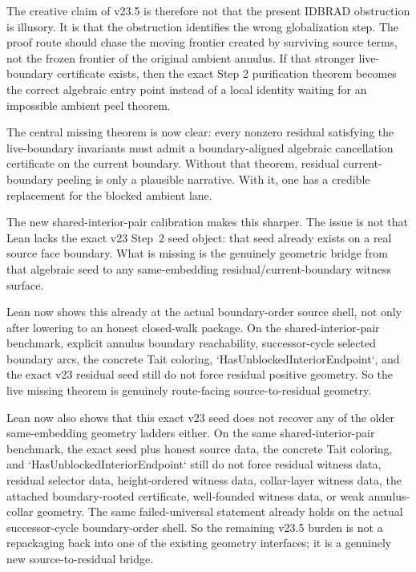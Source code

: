 \documentclass[11pt]{article}
\begin{document}
The creative claim of v23.5 is therefore not that the present IDBRAD
obstruction is illusory.  It is that the obstruction identifies the wrong
globalization step.  The proof route should chase the moving frontier created by
surviving source terms, not the frozen frontier of the original ambient annulus.
If that stronger live-boundary certificate exists, then the exact Step 2
purification theorem becomes the correct algebraic entry point instead of a
local identity waiting for an impossible ambient peel theorem.

The central missing theorem is now clear: every nonzero residual satisfying the
live-boundary invariants must admit a boundary-aligned algebraic cancellation
certificate on the current boundary.  Without that theorem, residual
current-boundary peeling is only a plausible narrative.  With it, one has a
credible replacement for the blocked ambient lane.

The new shared-interior-pair calibration makes this sharper.  The issue is not
that Lean lacks the exact v23 Step~2 seed object: that seed already exists on a
real source face boundary.  What is missing is the genuinely geometric bridge
from that algebraic seed to any same-embedding residual/current-boundary witness
surface.

Lean now shows this already at the actual boundary-order source shell, not only
after lowering to an honest closed-walk package.  On the shared-interior-pair
benchmark, explicit annulus boundary reachability, successor-cycle selected
boundary arcs, the concrete Tait coloring, `HasUnblockedInteriorEndpoint`, and
the exact v23 residual seed still do not force residual positive geometry.  So
the live missing theorem is genuinely route-facing source-to-residual geometry.

Lean now also shows that this exact v23 seed does not recover any of the older
same-embedding geometry ladders either.  On the same shared-interior-pair
benchmark, the exact seed plus honest source data, the concrete Tait coloring,
and `HasUnblockedInteriorEndpoint` still do not force residual witness data,
residual selector data, height-ordered witness data, collar-layer witness
data, the attached boundary-rooted certificate, well-founded witness data, or
weak annulus-collar geometry.  The same failed-universal statement already
holds on the actual successor-cycle boundary-order shell.  So the remaining
v23.5 burden is not a repackaging back into one of the existing geometry
interfaces; it is a genuinely new source-to-residual bridge.
\end{document}
